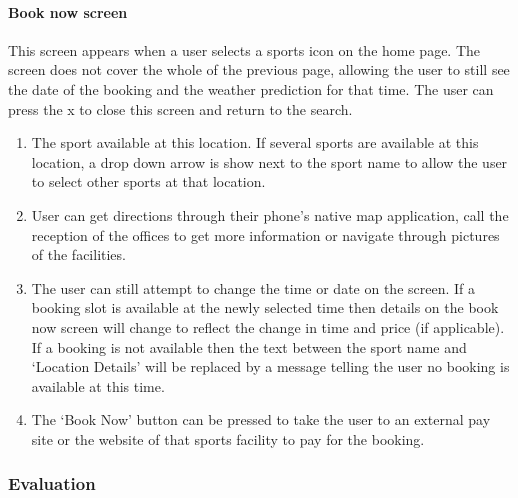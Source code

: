 \paragraph{Book now screen}
This screen appears when a user selects a sports icon on the home page. The
screen does not cover the whole of the previous page, allowing the user to
still see the date of the booking and the weather prediction for that time. The
user can press the x to close this screen and return to the search.

\begin{enumerate}
	\item The sport available at this location. If several sports are available
		at this location, a drop down arrow is show next to the sport name to
		allow the user to select other sports at that location.
	\item User can get directions through their phone's native map application,
		call the reception of the offices to get more information or navigate
		through pictures of the facilities.
	\item The user can still attempt to change the time or date on the screen.
		If a booking slot is available at the newly selected time then details
		on the book now screen will change to reflect the change in time and
		price (if applicable). If a booking is not available then the text
		between the sport name and `Location Details' will be replaced by a
		message telling the user no booking is available at this time.
	\item The `Book Now' button can be pressed to take the user to an external
		pay site or the website of that sports facility to pay for the booking.
\end{enumerate}

\fullwidth%
\subsubsection{Evaluation}

